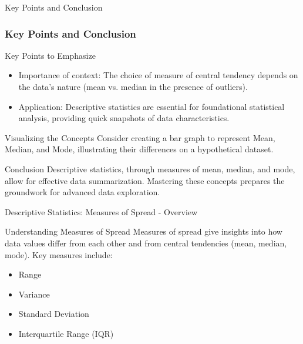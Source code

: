 \documentclass[aspectratio=169]{beamer}
\begin{document}
\begin{frame}[fragile]{Key Points and Conclusion}
  \frametitle{Key Points and Conclusion}
  \begin{block}{Key Points to Emphasize}
    \begin{itemize}
      \item Importance of context: The choice of measure of central tendency depends on the data's nature (mean vs. median in the presence of outliers).
      \item Application: Descriptive statistics are essential for foundational statistical analysis, providing quick snapshots of data characteristics.
    \end{itemize}
  \end{block}

  \begin{block}{Visualizing the Concepts}
    Consider creating a bar graph to represent Mean, Median, and Mode, illustrating their differences on a hypothetical dataset.
  \end{block}

  \begin{block}{Conclusion}
    Descriptive statistics, through measures of mean, median, and mode, allow for effective data summarization. Mastering these concepts prepares the groundwork for advanced data exploration.
  \end{block}
\end{frame}

\begin{frame}[fragile]{Descriptive Statistics: Measures of Spread - Overview}
    \begin{block}{Understanding Measures of Spread}
        Measures of spread give insights into how data values differ from each other and from central tendencies (mean, median, mode). Key measures include:
    \end{block}
    \begin{itemize}
        \item Range
        \item Variance
        \item Standard Deviation
        \item Interquartile Range (IQR)
    \end{itemize}
\end{frame}
\end{document}
